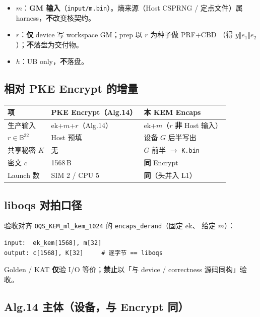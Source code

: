 \documentclass[UTF8,a4paper,11pt]{ctexart}
\begin{document}
\begin{itemize}
  \item $m$：\textbf{GM 输入}（\texttt{input/m.bin}）。熵来源（Host CSPRNG /
        定点文件）属 harness，\textbf{不}改变核契约。
  \item $r$：\textbf{仅} device 写 workspace GM；prep 以 $r$ 为种子做 PRF+CBD
        （得 $y\Vert e_1\Vert e_2$）；\textbf{不}落盘为交付物。
  \item $h$：UB only，\textbf{不}落盘。
\end{itemize}

\subsection{相对 PKE Encrypt 的增量}

\begin{longtable}{@{}L{3.2cm}L{5.0cm}L{4.6cm}@{}}
\toprule
项 & PKE Encrypt（Alg.14） & \textbf{本 KEM Encaps} \\
\midrule
生产输入 & $\mathrm{ek}$+$m$+$r$（Alg.14） &
  $\mathrm{ek}$+$m$（$r$ \textbf{非} Host 输入） \\
$r\in\mathbb{B}^{32}$ & Host 预填 & 设备 $G$ 后半写出 \\
共享秘密 $K$ & 无 & $G$ 前半 $\to$ \texttt{K.bin} \\
密文 $c$ & 1568\,B & \textbf{同} Encrypt \\
Launch 数 & SIM 2 / CPU 5 & \textbf{同}（头并入 L1） \\
\bottomrule
\end{longtable}

\subsection{liboqs 对拍口径}

验收对齐 \texttt{OQS\_KEM\_ml\_kem\_1024} 的 \texttt{encaps\_derand}（固定 $\mathrm{ek}$、
给定 $m$）：

\begin{verbatim}
input:  ek_kem[1568], m[32]
output: c[1568], K[32]     # 逐字节 == liboqs
\end{verbatim}

Golden / KAT \textbf{仅}验 I/O 等价；\textbf{禁止}以「与 device / correctness 源码同构」验收。

\subsection{Alg.14 主体（设备，与 Encrypt 同）}
\end{document}
